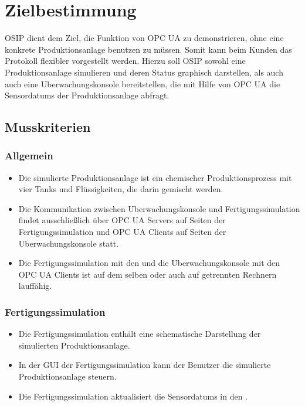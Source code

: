 \documentclass[parskip=full]{scrartcl}
\begin{document}
\pagebreak
\section{Zielbestimmung}
OSIP dient dem Ziel, die Funktion von \gls{OPC UA} zu demonstrieren, ohne eine konkrete \gls{Produktionsanlage}
benutzen zu müssen. Somit kann beim Kunden das Protokoll flexibler vorgestellt werden. Hierzu soll OSIP
sowohl eine \gls{Produktionsanlage} simulieren und deren Status graphisch darstellen, als auch auch eine \gls{Uberwachungskonsole}
bereitstellen, die mit Hilfe von \gls{OPC UA} die \glspl{Sensordatum} der \gls{Produktionsanlage} abfragt.\\

\subsection{Musskriterien}
\subsubsection{Allgemein}
\begin{itemize}
  \item Die simulierte \gls{Produktionsanlage} ist ein chemischer Produktionsprozess mit vier Tanks und Flüssigkeiten, die darin gemischt werden.
  \item Die Kommunikation zwischen \gls{Uberwachungskonsole} und \gls{Fertigungssimulation} findet ausschließlich \"uber
  \glspl{OPC UA Server} auf Seiten der \gls{Fertigungssimulation} und \glspl{OPC UA Client} auf Seiten der \gls{Uberwachungskonsole} statt.
  \item Die \gls{Fertigungssimulation} mit den  und die \gls{Uberwachungskonsole} mit den \glspl{OPC UA Client} ist auf dem selben oder auch auf getrennten Rechnern lauffähig.
\end{itemize}

\subsubsection{Fertigungssimulation}
\begin{itemize}
  \item Die \gls{Fertigungssimulation} enth\"alt eine schematische Darstellung der simulierten \gls{Produktionsanlage}.
  \item In der \gls{GUI} der \gls{Fertigungssimulation} kann der Benutzer die simulierte \gls{Produktionsanlage} steuern.
  \item Die \gls{Fertigungssimulation} aktualisiert die \glspl{Sensordatum} in den .
\end{itemize}
\end{document}
